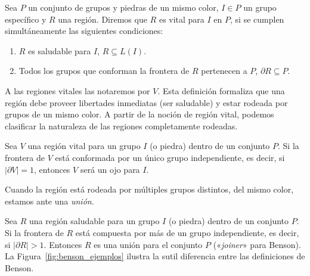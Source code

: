 \begin{definition}\label{def:reg_vital}
	Sea $P$ un conjunto de grupos y piedras de un mismo color, $I \in P$ un grupo específico y $R$ una región. Diremos que $R$ es vital para $I$ en $P$, si se cumplen simultáneamente las siguientes condiciones:
	\begin{enumerate}
		\item $R$ es saludable para $I$, $R\subseteq L(I)$.
		\item Todos los grupos que conforman la frontera de $R$ pertenecen a $P$, $\partial R \subseteq P$.
	\end{enumerate}
\end{definition}
A las regiones vitales las notaremos por $V$. Esta definición formaliza que una región debe proveer libertades inmediatas (ser saludable) y estar rodeada por grupos de un mismo color. A partir de la noción de región vital, podemos clasificar la naturaleza de las regiones completamente rodeadas.
\begin{definition}[Ojo]
	Sea $V$ una región vital para un grupo $I$ (o piedra) dentro de un conjunto $P$. Si la frontera de $V$ está conformada por un único grupo independiente, es decir, si $|\partial V| = 1$, entonces $V$ será un ojo para $I$.
\end{definition}
Cuando la región está rodeada por múltiples grupos distintos, del mismo color, estamos ante una \textit{unión}.
\begin{definition}[Unión]
	Sea $R$ una región saludable para un grupo $I$ (o piedra) dentro de un conjunto $P$. Si la frontera de $R$ está compuesta por más de un grupo independiente, es decir, si $|\partial R| > 1$. Entonces $R$ es una unión para el conjunto $P$ («\textit{joiner}» para Benson). La Figura~\ref{fig:benson_ejemplos} ilustra la sutil diferencia entre las definiciones de Benson.
\end{definition}
